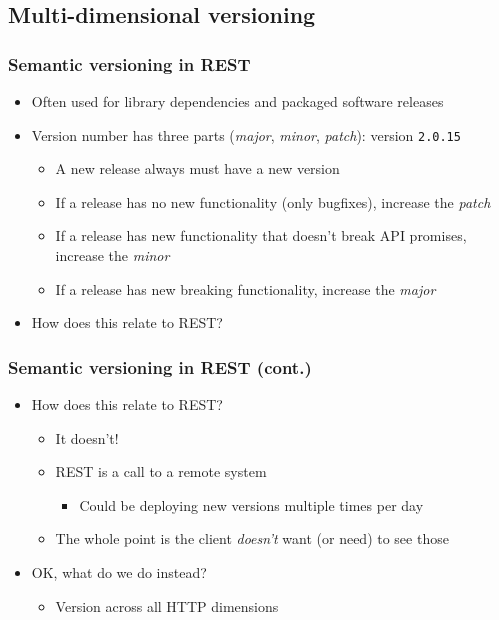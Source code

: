\documentclass[8pt]{article}
\begin{document}
\subsection{Multi-dimensional versioning}
\label{sec:org3b6dc2b}
\subsubsection{Semantic versioning in REST}
\label{sec:org4f42ef9}
\begin{itemize}
\item Often used for library dependencies and packaged software releases
\item Version number has three parts (\emph{major}, \emph{minor}, \emph{patch}): version \texttt{2.0.15}
\begin{itemize}
\item A new release always must have a new version
\item If a release has no new functionality (only bugfixes), increase the \emph{patch}
\item If a release has new functionality that doesn't break API promises, increase the \emph{minor}
\item If a release has new breaking functionality, increase the \emph{major}
\end{itemize}
\item How does this relate to REST?
\end{itemize}
\subsubsection{Semantic versioning in REST (cont.)}
\label{sec:org96ff329}
\begin{itemize}
\item How does this relate to REST?
\begin{itemize}
\item It doesn't!
\item REST is a call to a remote system
\begin{itemize}
\item Could be deploying new versions multiple times per day
\end{itemize}
\item The whole point is the client \emph{doesn't} want (or need) to see those
\end{itemize}

\item OK, what do we do instead?
\begin{itemize}
\item Version across all HTTP dimensions
\end{itemize}
\end{itemize}
\end{document}
